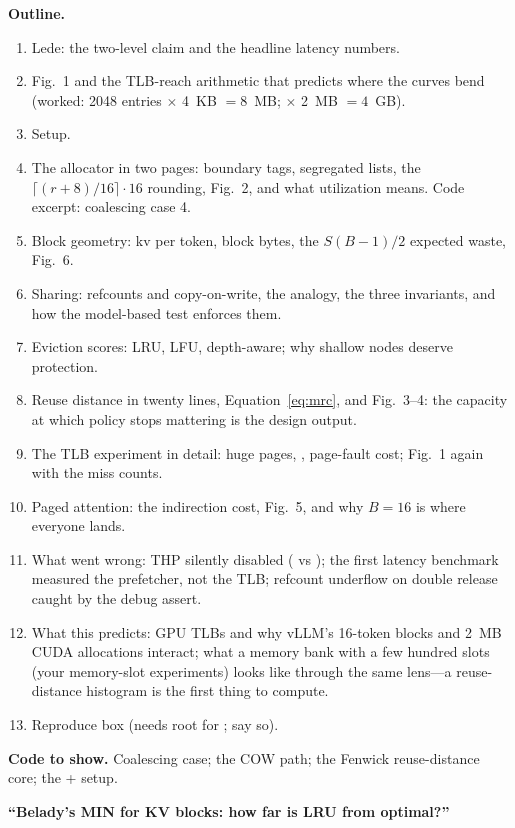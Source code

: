 \begin{blogbox}
\textbf{Outline.}
\begin{enumerate}
  \item Lede: the two-level claim and the headline latency numbers.
  \item Fig.~1 and the TLB-reach arithmetic that predicts where the curves bend (worked: 2048 entries $\times$ 4~KB $= 8$~MB; $\times$ 2~MB $= 4$~GB).
  \item Setup.
  \item The allocator in two pages: boundary tags, segregated lists, the $\lceil (r+8)/16\rceil\cdot 16$ rounding, Fig.~2, and what utilization means. Code excerpt: coalescing case 4.
  \item Block geometry: kv per token, block bytes, the $S(B-1)/2$ expected waste, Fig.~6.
  \item Sharing: refcounts and copy-on-write, the  analogy, the three invariants, and how the model-based test enforces them.
  \item Eviction scores: LRU, LFU, depth-aware; why shallow nodes deserve protection.
  \item Reuse distance in twenty lines, Equation~\eqref{eq:mrc}, and Fig.~3--4: the capacity at which policy stops mattering is the design output.
  \item The TLB experiment in detail: huge pages, , page-fault cost; Fig.~1 again with the miss counts.
  \item Paged attention: the indirection cost, Fig.~5, and why $B=16$ is where everyone lands.
  \item What went wrong: THP silently disabled ( vs ); the first latency benchmark measured the prefetcher, not the TLB; refcount underflow on double release caught by the debug assert.
  \item What this predicts: GPU TLBs and why vLLM's 16-token blocks and 2~MB CUDA allocations interact; what a memory bank with a few hundred slots (your memory-slot experiments) looks like through the same lens---a reuse-distance histogram is the first thing to compute.
  \item Reproduce box (needs root for ; say so).
\end{enumerate}

\textbf{Code to show.} Coalescing case; the COW path; the Fenwick reuse-distance core; the + setup.

 \textbf{``Belady's MIN for KV blocks: how far is LRU from optimal?''}


\end{blogbox}
